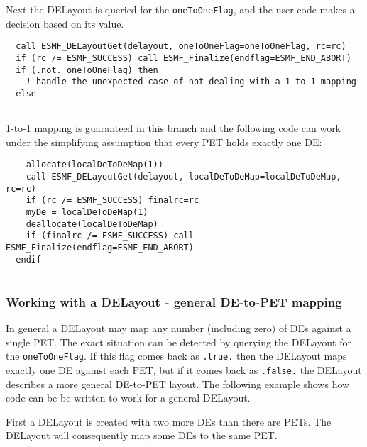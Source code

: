    Next the DELayout is queried for the {\tt oneToOneFlag}, and the user code
   makes a decision based on its value. 

 \begin{verbatim}
  call ESMF_DELayoutGet(delayout, oneToOneFlag=oneToOneFlag, rc=rc)
  if (rc /= ESMF_SUCCESS) call ESMF_Finalize(endflag=ESMF_END_ABORT)
  if (.not. oneToOneFlag) then
    ! handle the unexpected case of not dealing with a 1-to-1 mapping
  else
 
\end{verbatim}
 

   1-to-1 mapping is guaranteed in this branch and the following code can
   work under the simplifying assumption that every PET holds exactly one DE: 

 \begin{verbatim}
    allocate(localDeToDeMap(1))
    call ESMF_DELayoutGet(delayout, localDeToDeMap=localDeToDeMap, rc=rc)
    if (rc /= ESMF_SUCCESS) finalrc=rc
    myDe = localDeToDeMap(1)
    deallocate(localDeToDeMap)
    if (finalrc /= ESMF_SUCCESS) call ESMF_Finalize(endflag=ESMF_END_ABORT)
  endif
 
\end{verbatim}
 

   \subsubsection{Working with a DELayout - general DE-to-PET mapping}
   \label{DELayout_general_mapping}
   
   In general a DELayout may map any number (including zero) of DEs against
   a single PET. The exact situation can be detected by querying the DELayout
   for the {\tt oneToOneFlag}. If this flag comes back as {\tt .true.} then the 
   DELayout maps exactly one DE against each PET, but if it comes back as
   {\tt .false.} the DELayout describes a more general DE-to-PET layout. The 
   following example shows how code can be be written to work for a general
   DELayout.
  
   First a DELayout is created with two more DEs than there are PETs. The 
   DELayout will consequently map some DEs to the same PET. 

